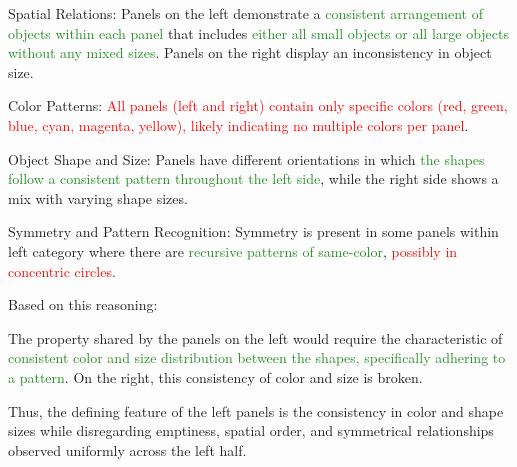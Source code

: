 \begin{tcolorbox}[breakable,enhanced jigsaw,opacityback=0,]
\begin{dialogue}
		Spatial Relations:
		Panels on the left demonstrate a \textcolor{ForestGreen}{consistent arrangement of objects within each panel} that includes \textcolor{ForestGreen}{either all small objects or all large objects without any mixed sizes}.
		Panels on the right display an inconsistency in object size.
		
		Color Patterns:
		\textcolor{red}{All panels (left and right) contain only specific colors (red, green, blue, cyan, magenta, yellow), likely indicating no multiple colors per panel}.
		
		Object Shape and Size:
		Panels have different orientations in which \textcolor{ForestGreen}{the shapes follow a consistent pattern throughout the left side}, while the right side shows a mix with varying shape sizes.
		
		Symmetry and Pattern Recognition:
		Symmetry is present in some panels within left category where there are \textcolor{ForestGreen}{recursive patterns of same-color}, \textcolor{red}{possibly in concentric circles}.
		
		Based on this reasoning:
		
		The property shared by the panels on the left would require the characteristic of \textcolor{ForestGreen}{consistent color and size distribution between the shapes, specifically adhering to a pattern}.
		On the right, this consistency of color and size is broken.
		
		Thus, the defining feature of the left panels is the consistency in color and shape sizes while disregarding emptiness, spatial order, and symmetrical relationships observed uniformly across the left half.
	\end{dialogue}
	\label{fig:task15-bongard}
\end{tcolorbox}




